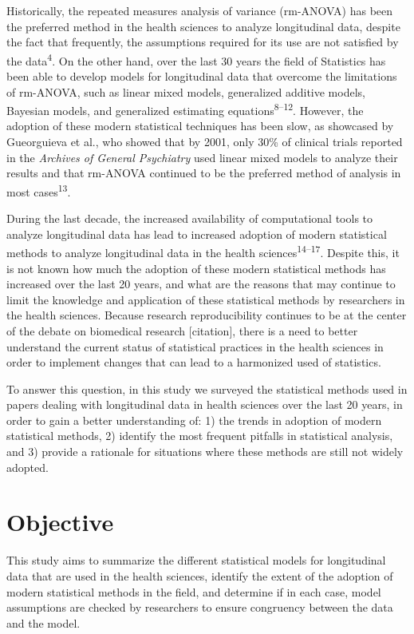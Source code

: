 \documentclass[
]{article}
\begin{document}
Historically, the repeated measures analysis of variance (rm-ANOVA) has
been the preferred method in the health sciences to analyze longitudinal
data, despite the fact that frequently, the assumptions required for its
use are not satisfied by the data\textsuperscript{4}. On the other hand,
over the last 30 years the field of Statistics has been able to develop
models for longitudinal data that overcome the limitations of rm-ANOVA,
such as linear mixed models, generalized additive models, Bayesian
models, and generalized estimating equations\textsuperscript{8--12}.
However, the adoption of these modern statistical techniques has been
slow, as showcased by Gueorguieva et al., who showed that by 2001, only
30\% of clinical trials reported in the \emph{Archives of General
Psychiatry} used linear mixed models to analyze their results and that
rm-ANOVA continued to be the preferred method of analysis in most
cases\textsuperscript{13}.

During the last decade, the increased availability of computational
tools to analyze longitudinal data has lead to increased adoption of
modern statistical methods to analyze longitudinal data in the health
sciences\textsuperscript{14--17}. Despite this, it is not known how much
the adoption of these modern statistical methods has increased over the
last 20 years, and what are the reasons that may continue to limit the
knowledge and application of these statistical methods by researchers in
the health sciences. Because research reproducibility continues to be at
the center of the debate on biomedical research {[}citation{]}, there is
a need to better understand the current status of statistical practices
in the health sciences in order to implement changes that can lead to a
harmonized used of statistics.

To answer this question, in this study we surveyed the statistical
methods used in papers dealing with longitudinal data in health sciences
over the last 20 years, in order to gain a better understanding of: 1)
the trends in adoption of modern statistical methods, 2) identify the
most frequent pitfalls in statistical analysis, and 3) provide a
rationale for situations where these methods are still not widely
adopted.

\hypertarget{objective}{%
\section{Objective}\label{objective}}

This study aims to summarize the different statistical models for
longitudinal data that are used in the health sciences, identify the
extent of the adoption of modern statistical methods in the field, and
determine if in each case, model assumptions are checked by researchers
to ensure congruency between the data and the model.
\end{document}

